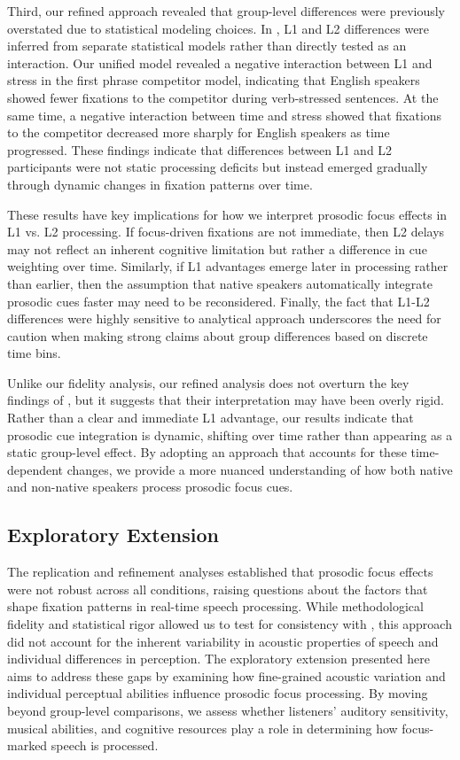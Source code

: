 Third, our refined approach revealed that group-level differences were previously overstated due to statistical modeling choices. In \citep{Ge2021}, L1 and L2 differences were inferred from separate statistical models rather than directly tested as an interaction. Our unified model revealed a negative interaction between L1 and stress in the first phrase competitor model, indicating that English speakers showed fewer fixations to the competitor during verb-stressed sentences. At the same time, a negative interaction between time and stress showed that fixations to the competitor decreased more sharply for English speakers as time progressed. These findings indicate that differences between L1 and L2 participants were not static processing deficits but instead emerged gradually through dynamic changes in fixation patterns over time.

These results have key implications for how we interpret prosodic focus effects in L1 vs. L2 processing. If focus-driven fixations are not immediate, then L2 delays may not reflect an inherent cognitive limitation but rather a difference in cue weighting over time. Similarly, if L1 advantages emerge later in processing rather than earlier, then the assumption that native speakers automatically integrate prosodic cues faster may need to be reconsidered. Finally, the fact that L1-L2 differences were highly sensitive to analytical approach underscores the need for caution when making strong claims about group differences based on discrete time bins.

Unlike our fidelity analysis, our refined analysis does not overturn the key findings of \citep{Ge2021}, but it suggests that their interpretation may have been overly rigid. Rather than a clear and immediate L1 advantage, our results indicate that prosodic cue integration is dynamic, shifting over time rather than appearing as a static group-level effect. By adopting an approach that accounts for these time-dependent changes, we provide a more nuanced understanding of how both native and non-native speakers process prosodic focus cues.

\subsection{Exploratory Extension}

The replication and refinement analyses established that prosodic focus effects were not robust across all conditions, raising questions about the factors that shape fixation patterns in real-time speech processing. While methodological fidelity and statistical rigor allowed us to test for consistency with \citep{Ge2021}, this approach did not account for the inherent variability in acoustic properties of speech and individual differences in perception. The exploratory extension presented here aims to address these gaps by examining how fine-grained acoustic variation and individual perceptual abilities influence prosodic focus processing. By moving beyond group-level comparisons, we assess whether listeners’ auditory sensitivity, musical abilities, and cognitive resources play a role in determining how focus-marked speech is processed.

